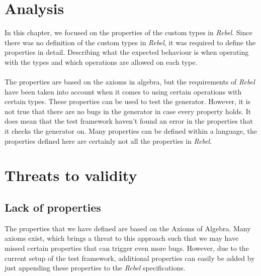\section{Analysis}
In this chapter, we focused on the properties of the custom types in \textit{Rebel}. Since there was no definition of the custom types in \textit{Rebel}, it was required to define the properties in detail. Describing what the expected behaviour is when operating with the types and which operations are allowed on each type.\\
\\
The properties are based on the axioms in algebra, but the requirements of \textit{Rebel} have been taken into account when it comes to using certain operations with certain types. These properties can be used to test the generator. However, it is not true that there are no bugs in the generator in case every property holds. It does mean that the test framework haven't found an error in the properties that it checks the generator on. Many properties can be defined within a language, the properties defined here are certainly not all the properties in \textit{Rebel}.

\section{Threats to validity}

\subsection*{Lack of properties}
The properties that we have defined are based on the Axioms of Algebra. Many axioms exist, which brings a threat to this approach such that we may have missed certain properties that can trigger even more bugs. However, due to the current setup of the test framework, additional properties can easily be added by just appending these properties to the \textit{Rebel} specifications.


